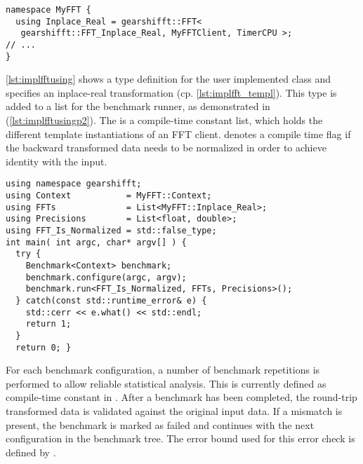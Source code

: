 \begin{lstlisting}[caption={Define FFT client types for corresponding FFTs},label={lst:implfftusing}]
namespace MyFFT { 
  using Inplace_Real = gearshifft::FFT<
   gearshifft::FFT_Inplace_Real, MyFFTClient, TimerCPU >;
// ...
}
\end{lstlisting}

\cref{lst:implfftusing} shows a type definition for the user implemented class  and specifies an inplace-real transformation (cp. \cref{lst:implfft_templ}).
This type is added to a list for the benchmark runner, as demonstrated in  (\cref{lst:implfftusingp2}). The  is a compile-time constant list, which holds the different template instantiations of an FFT client.  denotes a compile time flag if the backward transformed data needs to be normalized in order to achieve identity with the input.

\begin{lstlisting}[caption={Using FFT client types to run the benchmarks},label={lst:implfftusingp2}]
using namespace gearshifft;
using Context           = MyFFT::Context;         
using FFTs              = List<MyFFT::Inplace_Real>;
using Precisions        = List<float, double>;   
using FFT_Is_Normalized = std::false_type;
int main( int argc, char* argv[] ) {                                                        
  try {                                                  
    Benchmark<Context> benchmark;
    benchmark.configure(argc, argv);                     
    benchmark.run<FFT_Is_Normalized, FFTs, Precisions>();
  } catch(const std::runtime_error& e) {
    std::cerr << e.what() << std::endl;                  
    return 1;                                            
  }                                                      
  return 0; }                                                        
\end{lstlisting}

For each benchmark configuration, a number of benchmark repetitions is performed to allow reliable statistical analysis. This is currently defined as compile-time constant in . After a benchmark has been completed, the round-trip transformed data is validated against the original input data. If a mismatch is present, the benchmark is marked as failed and \gearshifft{} continues with the next configuration in the benchmark tree. The error bound used for this error check is defined by . 

